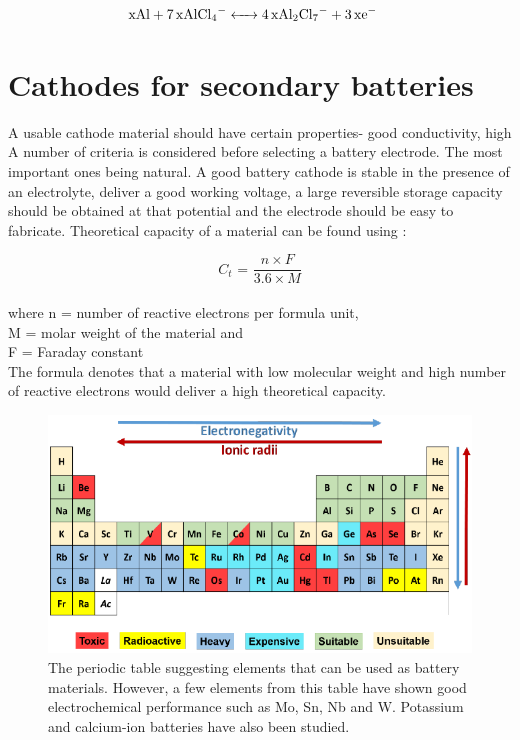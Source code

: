 \begin{align*}
        \ce{xAl + 7x\ce{AlCl4-} &<-> 4x\ce{Al2Cl7-} + 3x\ce{e-}}
\end{align*}

\section{Cathodes for secondary batteries}
A usable cathode material should have certain properties- good conductivity, high A number of criteria is considered before selecting a battery electrode. The most important ones being natural. A good battery cathode is stable in the presence of an electrolyte, deliver a good working voltage, a large reversible storage capacity should be obtained at that potential and the electrode should be easy to fabricate. 
Theoretical capacity of a material can be found using :

\begin{equation} \label{eq3}
   C_{t} \text{ = } \frac{n \times F}{3.6 \times M}
\end{equation}\\
where n = number of reactive electrons per formula unit,\\
M = molar weight of the material and\\
F = Faraday constant\\
The formula denotes that a material with low molecular weight and high number of reactive electrons would deliver a high theoretical capacity.

\begin{figure}[h!]
\centering
\includegraphics[width=\textwidth]{Figures/chap1fig/pertab}
\caption{The periodic table suggesting elements that can be used as battery materials. However, a few elements from this table have shown good electrochemical performance such as Mo, Sn, Nb and W. Potassium and calcium-ion batteries have also been studied.}
\label{Figures/chap1fig:pertab}
\end{figure}

